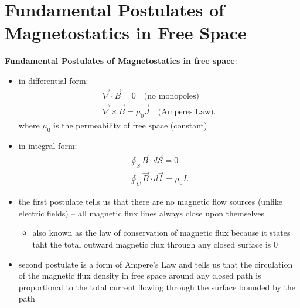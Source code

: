 \documentclass[10pt]{article}
\begin{document}
\section{Fundamental Postulates of Magnetostatics in Free Space}
\begin{theorem}
    \textbf{Fundamental Postulates of Magnetostatics in free space}:
    \begin{itemize}
        \item in differential form:
            \begin{gather*}
                \vec{\nabla } \cdot \vec{B} = 0 \quad \text{(no monopoles)} \\ 
                \vec{\nabla } \times \vec{B} = \mu_0 \vec{J} \quad \text{(Amperes Law)}
            .\end{gather*}
            where $\mu_0$ is the permeability of free space (constant)
        \item in integral form:
            \begin{gather*}
                \oint_{S} \vec{B} \cdot d\vec{S} = 0 \\ 
                \oint_{C} \vec{B} \cdot d\vec{l} = \mu_0 I
            .\end{gather*}
    \end{itemize}
\end{theorem}
\begin{itemize}
    \item the first postulate tells us that there are no magnetic flow sources (unlike electric fields) -- all magnetic flux lines always close upon themselves
        \begin{itemize}
            \item also known as the law of conservation of magnetic flux because it states taht the total outward magnetic flux through any closed surface is 0
        \end{itemize}
    \item second postulate is a form of Ampere's Law and tells us that the circulation of the magnetic flux density in free space around any closed path is proportional to the total current flowing through the surface bounded by the path
\end{itemize}
\end{document}

